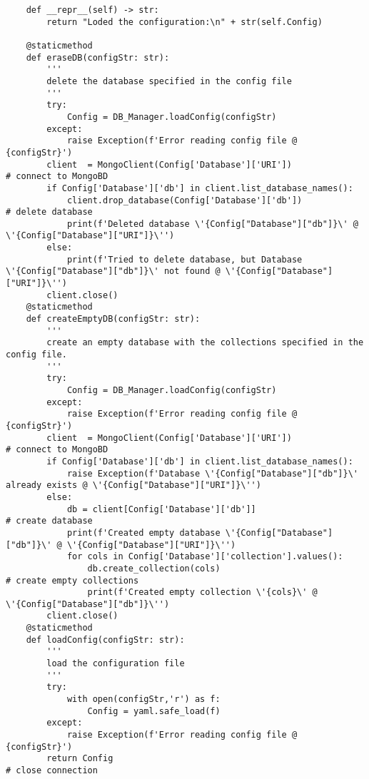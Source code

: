 \begin{verbatim}
    def __repr__(self) -> str:
        return "Loded the configuration:\n" + str(self.Config)
    
    @staticmethod
    def eraseDB(configStr: str):
        '''
        delete the database specified in the config file
        '''
        try:
            Config = DB_Manager.loadConfig(configStr)
        except:
            raise Exception(f'Error reading config file @ {configStr}')
        client  = MongoClient(Config['Database']['URI'])                                    # connect to MongoBD
        if Config['Database']['db'] in client.list_database_names():
            client.drop_database(Config['Database']['db'])                                  # delete database
            print(f'Deleted database \'{Config["Database"]["db"]}\' @ \'{Config["Database"]["URI"]}\'')
        else:
            print(f'Tried to delete database, but Database \'{Config["Database"]["db"]}\' not found @ \'{Config["Database"]["URI"]}\'')
        client.close()
    @staticmethod
    def createEmptyDB(configStr: str):
        '''
        create an empty database with the collections specified in the config file.
        '''
        try:
            Config = DB_Manager.loadConfig(configStr)
        except:
            raise Exception(f'Error reading config file @ {configStr}')
        client  = MongoClient(Config['Database']['URI'])                                    # connect to MongoBD
        if Config['Database']['db'] in client.list_database_names():
            raise Exception(f'Database \'{Config["Database"]["db"]}\' already exists @ \'{Config["Database"]["URI"]}\'')
        else:
            db = client[Config['Database']['db']]                                           # create database
            print(f'Created empty database \'{Config["Database"]["db"]}\' @ \'{Config["Database"]["URI"]}\'')
            for cols in Config['Database']['collection'].values():
                db.create_collection(cols)                                                  # create empty collections
                print(f'Created empty collection \'{cols}\' @ \'{Config["Database"]["db"]}\'')
        client.close() 
    @staticmethod
    def loadConfig(configStr: str):
        '''
        load the configuration file
        '''
        try:
            with open(configStr,'r') as f:
                Config = yaml.safe_load(f)
        except:
            raise Exception(f'Error reading config file @ {configStr}')
        return Config                                                                     # close connection
    

\end{verbatim}
